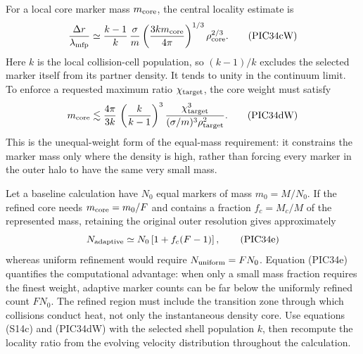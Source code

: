 For a local core marker mass \(m_{\rm core}\), the central locality estimate is
\[
 \frac{\Delta r}{\lambda_{\rm mfp}}
 \simeq
 \frac{k-1}{k}\,
 \frac{\sigma}{m}
 \left(\frac{3k m_{\rm core}}{4\pi}\right)^{1/3}
 \rho_{\rm core}^{2/3}.                                  \tag{PIC34cW}
\]
Here \(k\) is the local collision-cell population, so \((k-1)/k\) excludes
the selected marker itself from its partner density.  It tends to unity in
the continuum limit.
To enforce a requested maximum ratio \(\chi_{\rm target}\), the core weight
must satisfy
\[
 m_{\rm core}\lesssim
 \frac{4\pi}{3k}\,
 \left(\frac{k}{k-1}\right)^3
 \frac{\chi_{\rm target}^3}
 {(\sigma/m)^3\rho_{\rm target}^2}.                       \tag{PIC34dW}
\]
This is the unequal-weight form of the equal-mass requirement: it constrains
the marker mass only where the density is high, rather than forcing every
marker in the outer halo to have the same very small mass.

Let a baseline calculation have \(N_0\) equal markers of mass \(m_0=M/N_0\).
If the refined core needs \(m_{\rm core}=m_0/F\) and contains a fraction
\(f_c=M_c/M\) of the represented mass, retaining the original outer
resolution gives approximately
\[
 N_{\rm adaptive}
 \simeq N_0\left[1+f_c(F-1)\right],                       \tag{PIC34e}
\]
whereas uniform refinement would require \(N_{\rm uniform}=FN_0\).
Equation (PIC34e) quantifies the computational advantage: when only a small
mass fraction requires the finest weight, adaptive marker counts can be far
below the uniformly refined count \(FN_0\).  The refined region must include
the transition zone through which collisions conduct heat, not only the
instantaneous density core.  Use equations (S14c) and (PIC34dW) with the
selected shell population \(k\), then recompute the locality ratio from the
evolving velocity distribution throughout the calculation.

